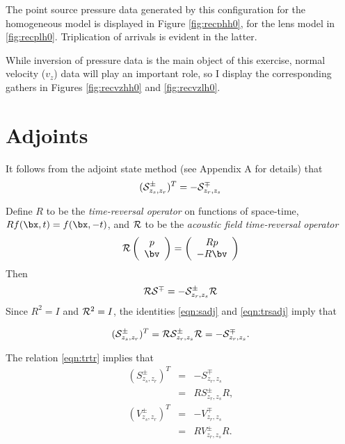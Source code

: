 The point source pressure data generated by this configuration for the
homogeneous model is displayed in Figure \ref{fig:recphh0}, for the
lens model in \ref{fig:recplh0}. Triplication of arrivals is evident in the latter.



While inversion of pressure data is the main object of this exercise,
normal velocity ($v_z$) data will play an important role, so I display
the corresponding gathers in Figures \ref{fig:recvzhh0} and \ref{fig:recvzlh0}.


\section{Adjoints}

It follows from the adjoint state method (see Appendix A for details) that
\begin{equation}
  \label{eqn:sadj1}
  ({\cal S}^{\pm}_{z_s, z_r})^T = -{\cal S}^{\mp}_{z_r,z_s}
\end{equation}

Define $R$ to be the {\em time-reversal operator} on functions of
space-time, $Rf(\bx,t) = f(\bx,-t)$, and ${\cal R}$ to be the {\em
  acoustic field time-reversal operator}
\begin{equation}
  \label{eqn:trdef}
  {\cal R} \left(
    \begin{array}{c}
      p\\
      \bv
    \end{array}
  \right) =
  \left(
    \begin{array}{c}
      Rp\\
      -R\bv
    \end{array}
  \right)
\end{equation}
Then 
\begin{equation}
  \label{eqn:trsadj}
  {\cal R}{\cal S}^{\mp} = -{\cal S}^{\pm}_{z_r,z_s}{\cal R}
\end{equation}
Since $R^2 = I$ and ${\cal R}^2 = I$, the identities \ref{eqn:sadj} and \ref{eqn:trsadj} imply that

\begin{equation} 
  \label{eqn:trtr}
 ({\cal S}^{\pm}_{z_s,z_r})^T = {\cal R}{\cal S}_{z_r,z_s}^{\pm}{\cal R}=
 -{\cal S}^{\mp}_{z_r,z_s}.
\end{equation}

The relation \ref{eqn:trtr} implies that
\begin{eqnarray}
  (S^{\pm}_{z_s,z_r})^T &=& -S^{\mp}_{z_r,z_s} \nonumber\\
                        &=& R S^{\pm}_{z_r,z_s}R, \nonumber\\
    (V^{\pm}_{z_s,z_r})^T &=& -V^{\mp}_{z_r,z_s} \nonumber\\
                        &=& R V^{\pm}_{z_r,z_s}R.
                            \label{eqn:trtrcomp}
\end{eqnarray}

